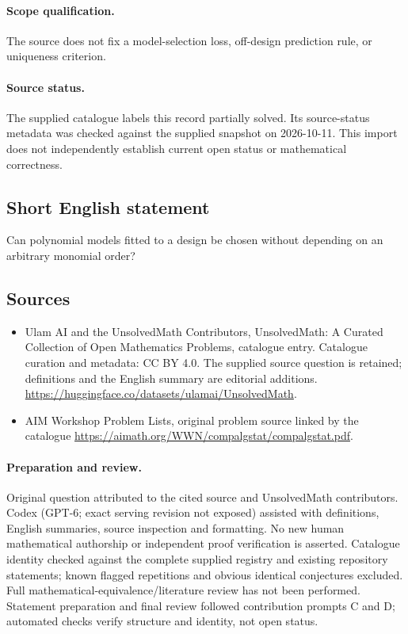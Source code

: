 \documentclass[11pt]{article}
\begin{document}
\paragraph{Scope qualification.}
The source does not fix a model-selection loss, off-design prediction rule, or uniqueness criterion.
\paragraph{Source status.}
The supplied catalogue labels this record partially solved. Its source-status metadata was checked against the supplied snapshot on 2026-10-11. This import does not independently establish current open status or mathematical correctness.
\subsection{Short English statement}
Can polynomial models fitted to a design be chosen without depending on an arbitrary monomial order?
\subsection{Sources}
\begin{itemize}
\item[S1] Ulam AI and the UnsolvedMath Contributors, UnsolvedMath: A Curated Collection of Open Mathematics Problems, catalogue entry. Catalogue curation and metadata: CC BY 4.0. The supplied source question is retained; definitions and the English summary are editorial additions.
\url{https://huggingface.co/datasets/ulamai/UnsolvedMath}.
\item[S2] AIM Workshop Problem Lists, original problem source linked by the catalogue
\url{https://aimath.org/WWN/compalgstat/compalgstat.pdf}.
\end{itemize}
\paragraph{Preparation and review.}
Original question attributed to the cited source and UnsolvedMath contributors. Codex (GPT-6; exact serving revision not exposed) assisted with definitions, English summaries, source inspection and formatting. No new human mathematical authorship or independent proof verification is asserted. Catalogue identity checked against the complete supplied registry and existing repository statements; known flagged repetitions and obvious identical conjectures excluded. Full mathematical-equivalence/literature review has not been performed. Statement preparation and final review followed contribution prompts C and D; automated checks verify structure and identity, not open status.
\label{end:statement}
\end{document}
